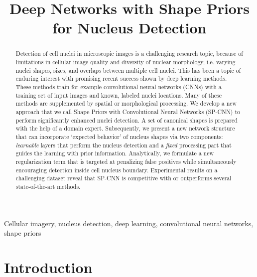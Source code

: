 \documentclass{article}
\title{Deep Networks with Shape Priors for Nucleus Detection\vspace{-5pt}}
\begin{document}
%
\maketitle
%
\begin{abstract}
	\emergencystretch=10pt
Detection of cell nuclei in microscopic images is a challenging research topic, because of limitations in cellular image quality and diversity of nuclear morphology, i.e. varying nuclei shapes, sizes, and overlaps between multiple cell nuclei. This has been a topic of enduring interest with promising recent success shown by deep learning methods. These methods train for example convolutional neural networks (CNNs) with a training set of input images and known, labeled nuclei locations. Many of these methods are supplemented by spatial or morphological processing. We develop a new approach that we call Shape Priors with Convolutional Neural Networks (SP-CNN) to perform significantly enhanced nuclei detection. A set of canonical shapes is prepared with the help of a domain expert. Subsequently, we present a new network structure that can incorporate `expected behavior' of nucleus shapes via two components: {\em learnable} layers that perform the nucleus detection and a {\em fixed} processing part that guides the learning with prior information. Analytically, we formulate a new regularization term that is targeted at penalizing false positives while simultaneously encouraging detection inside cell nucleus boundary. Experimental results on a challenging dataset reveal that SP-CNN is competitive with or outperforms several state-of-the-art methods.\vspace{-5pt}
\end{abstract}
%
\begin{keywords}
	Cellular imagery, nucleus detection, deep learning, convolutional neural networks, shape priors\vspace{-5pt}
\end{keywords}
%
\section{Introduction}\vspace{-5pt}
\label{sec:intro}
\end{document}
